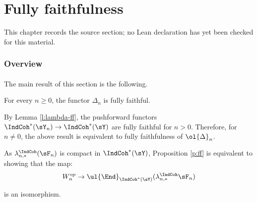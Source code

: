 \chapter{Fully faithfulness}
\label{tates-thesis-de-rham-setting-chapter-07}

\begin{remark}
\label{tates-thesis-de-rham-setting-chapter-07-source}
This chapter records the source section; no Lean declaration has yet been checked for this material.
\notready
\end{remark}

\label{s:ff}

\subsection{Overview}

\subsubsection{}

The main result of this section is the following.

\begin{prop}
\notready\label{p:ff}

For every $n \geq 0$, the functor $\Delta_n$ is fully faithful.

\end{prop}

\begin{rem}
\notready\label{r:kash-y}

By Lemma \ref{l:lambda-ff}, the pushforward
functors $\IndCoh^*(\sY_n) \to \IndCoh^*(\sY)$ are fully faithful
for $n>0$. Therefore, for $n \neq 0$, the above result is equivalent
to fully faithfulness of $\ol{\Delta}_n$.

\end{rem}

\begin{rem}
\notready

As $\lambda_{n,*}^{\IndCoh}(\sF_n)$ is compact in
$\IndCoh^*(\sY)$, Proposition \ref{p:ff} is equivalent to showing
that the map:
%
\[
W_n^{op} \to \ul{\End}_{\IndCoh^*(\sY)}(\lambda_{n,*}^{\IndCoh}\sF_n)
\]

 is an isomorphism.

\end{rem}

